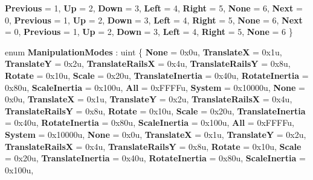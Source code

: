 \begin{DoxyCompactItemize}
{\bfseries Previous} = 1, 
\newline
{\bfseries Up} = 2, 
{\bfseries Down} = 3, 
{\bfseries Left} = 4, 
{\bfseries Right} = 5, 
\newline
{\bfseries None} = 6, 
{\bfseries Next} = 0, 
{\bfseries Previous} = 1, 
{\bfseries Up} = 2, 
\newline
{\bfseries Down} = 3, 
{\bfseries Left} = 4, 
{\bfseries Right} = 5, 
{\bfseries None} = 6, 
\newline
{\bfseries Next} = 0, 
{\bfseries Previous} = 1, 
{\bfseries Up} = 2, 
{\bfseries Down} = 3, 
\newline
{\bfseries Left} = 4, 
{\bfseries Right} = 5, 
{\bfseries None} = 6
 \}
\item 
\mbox{\label{namespace_windows_1_1_u_i_1_1_xaml_1_1_input_a8c481e845e38fcfb6aa19028f4362554}} 
enum {\bfseries Manipulation\+Modes} \+: uint \{ \newline
{\bfseries None} = 0x0u, 
{\bfseries TranslateX} = 0x1u, 
{\bfseries TranslateY} = 0x2u, 
{\bfseries Translate\+RailsX} = 0x4u, 
\newline
{\bfseries Translate\+RailsY} = 0x8u, 
{\bfseries Rotate} = 0x10u, 
{\bfseries Scale} = 0x20u, 
{\bfseries Translate\+Inertia} = 0x40u, 
\newline
{\bfseries Rotate\+Inertia} = 0x80u, 
{\bfseries Scale\+Inertia} = 0x100u, 
{\bfseries All} = 0x\+F\+F\+F\+Fu, 
{\bfseries System} = 0x10000u, 
\newline
{\bfseries None} = 0x0u, 
{\bfseries TranslateX} = 0x1u, 
{\bfseries TranslateY} = 0x2u, 
{\bfseries Translate\+RailsX} = 0x4u, 
\newline
{\bfseries Translate\+RailsY} = 0x8u, 
{\bfseries Rotate} = 0x10u, 
{\bfseries Scale} = 0x20u, 
{\bfseries Translate\+Inertia} = 0x40u, 
\newline
{\bfseries Rotate\+Inertia} = 0x80u, 
{\bfseries Scale\+Inertia} = 0x100u, 
{\bfseries All} = 0x\+F\+F\+F\+Fu, 
{\bfseries System} = 0x10000u, 
\newline
{\bfseries None} = 0x0u, 
{\bfseries TranslateX} = 0x1u, 
{\bfseries TranslateY} = 0x2u, 
{\bfseries Translate\+RailsX} = 0x4u, 
\newline
{\bfseries Translate\+RailsY} = 0x8u, 
{\bfseries Rotate} = 0x10u, 
{\bfseries Scale} = 0x20u, 
{\bfseries Translate\+Inertia} = 0x40u, 
\newline
{\bfseries Rotate\+Inertia} = 0x80u, 
{\bfseries Scale\+Inertia} = 0x100u, 

\end{DoxyCompactItemize}
